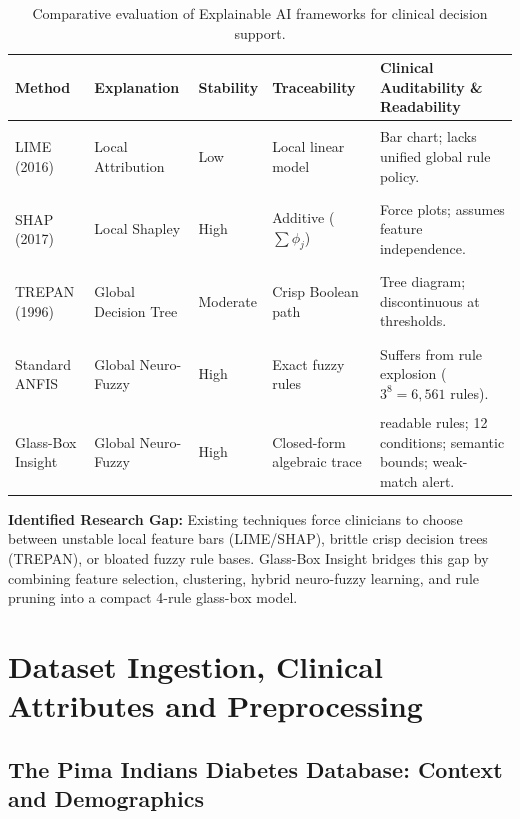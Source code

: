 \documentclass{report}
\begin{document}
\begin{table}[htbp]
\centering
\footnotesize
\renewcommand{\arraystretch}{0.80}
\setlength{\tabcolsep}{2.5pt}
\begin{tabularx}{\textwidth}{>{\bfseries\raggedright\arraybackslash}p{2.0cm} >{\raggedright\arraybackslash}p{1.9cm} >{\raggedright\arraybackslash}p{1.4cm} >{\raggedright\arraybackslash}p{2.1cm} >{\raggedright\arraybackslash}X}
\toprule
\textbf{Method} & \textbf{Explanation} & \textbf{Stability} & \textbf{Traceability} & \textbf{Clinical Auditability \& Readability} \\
\midrule
LIME (2016) & Local Attribution & Low & Local linear model & Bar chart; lacks unified global rule policy. \\
\midrule
SHAP (2017) & Local Shapley & High & Additive ($\sum \phi_j$) & Force plots; assumes feature independence. \\
\midrule
TREPAN (1996) & Global Decision Tree & Moderate & Crisp Boolean path & Tree diagram; discontinuous at thresholds. \\
\midrule
Standard ANFIS & Global Neuro-Fuzzy & High & Exact fuzzy rules & Suffers from rule explosion ($3^8 = 6{,}561$ rules). \\
\midrule
Glass-Box Insight & Global Neuro-Fuzzy & High & Closed-form algebraic trace & 4 readable rules; 12 conditions; semantic bounds; weak-match alert. \\
\bottomrule
\end{tabularx}
\caption[Comparative Evaluation of Explainable AI Frameworks]{Comparative evaluation of Explainable AI frameworks for clinical decision support.}
\label{tab:literature_comparison}
\end{table}

\textbf{Identified Research Gap:} Existing techniques force clinicians to choose between unstable local feature bars (LIME/SHAP), brittle crisp decision trees (TREPAN), or bloated fuzzy rule bases. Glass-Box Insight bridges this gap by combining feature selection, clustering, hybrid neuro-fuzzy learning, and rule pruning into a compact 4-rule glass-box model.


\chapter{Dataset Ingestion, Clinical Attributes and Preprocessing}

\section{The Pima Indians Diabetes Database: Context and Demographics}
\end{document}
